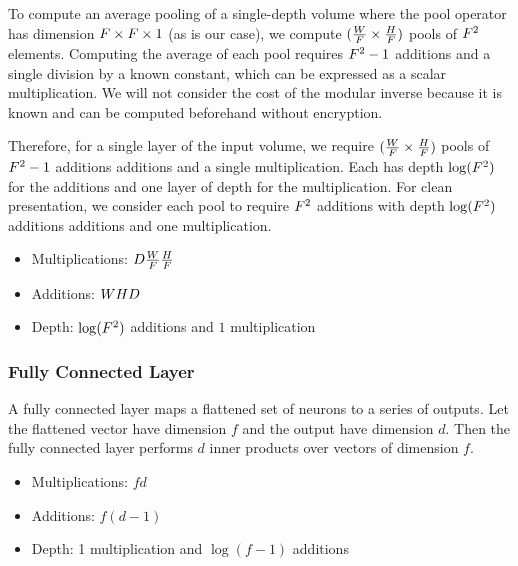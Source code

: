 To compute an average pooling of a single-depth volume where the pool operator has dimension $F \times F \times 1$ (as is our case), we compute $(\frac{W}{F} \times \frac{H}{F})$ pools of $F^{2}$ elements. Computing the average of each pool requires $F^{2}-1 $ additions and a single division by a known constant, which can be expressed as a scalar multiplication. We will not consider the cost of the modular inverse because it is known and can be computed beforehand without encryption.  

Therefore, for a single layer of the input volume, we require $(\frac{W}{F} \times \frac{H}{F})$ pools of $F^{2}-1 $ additions additions and a single multiplication. Each has depth $\log(F^{2})$ for the additions and one layer of depth for the multiplication.
For clean presentation, we consider each pool to require  $F^{2}$ additions with depth $\log(F^{2})$ additions additions and one multiplication.

\begin{itemize}
	\item Multiplications: $D\frac{W}{F}\frac{H}{F}$
	\item Additions: $ W H D$
	\item Depth: $\log(F^{2})$ additions and $1$ multiplication
\end{itemize}



\subsubsection{Fully Connected Layer}
A fully connected layer maps a flattened set of neurons to a series of outputs. Let the flattened vector have dimension $f$ and the output have dimension $d$.
Then the fully connected layer performs $d$ inner products over vectors of dimension $f$. 
\begin{itemize}
	\item Multiplications: $fd$ 
	\item Additions: $f(d-1)$
	\item Depth: 1 multiplication and $\log(f-1)$ additions
\end{itemize}

